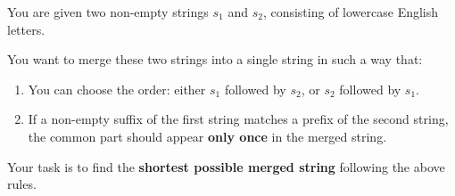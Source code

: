 You are given two non-empty strings $s_1$ and $s_2$, consisting of lowercase English letters.

You want to merge these two strings into a single string in such a way that:

\begin{enumerate}
    \item You can choose the order: either $s_1$ followed by $s_2$, or $s_2$ followed by $s_1$.
    \item If a non-empty suffix of the first string matches a prefix of the second string, the common part should appear \textbf{only once} in the merged string.
\end{enumerate}

Your task is to find the \textbf{shortest possible merged string} following the above rules.